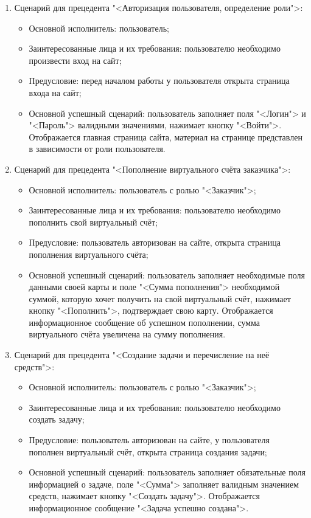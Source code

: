 \begin{enumerate}
\item Сценарий для прецедента "<Авторизация пользователя, определение роли">:
	\begin{itemize}
		\item Основной исполнитель: пользователь;
		\item Заинтересованные лица и их требования: пользователю необходимо произвести вход на сайт;
		\item Предусловие: перед началом работы у пользователя открыта страница входа на сайт;
		\item Основной успешный сценарий: пользователь заполняет поля "<Логин"> и "<Пароль"> валидными значениями, нажимает кнопку "<Войти">. Отображается главная страница сайта, материал на странице представлен в зависимости от роли пользователя.
	\end{itemize}
\item Сценарий для прецедента "<Пополнение виртуального счёта заказчика">:
	\begin{itemize}
		\item Основной исполнитель: пользователь с ролью "<Заказчик">;
		\item Заинтересованные лица и их требования: пользователю необходимо пополнить свой виртуальный счёт;
		\item Предусловие: пользователь авторизован на сайте, открыта страница пополнения виртуального счёта;
		\item Основной успешный сценарий: пользователь заполняет необходимые поля данными своей карты и поле "<Сумма пополнения"> необходимой суммой, которую хочет получить на свой виртуальный счёт, нажимает кнопку "<Пополнить">, подтверждает свою карту. Отображается информационное сообщение об успешном пополнении, сумма виртуального счёта увеличена на сумму пополнения.
	\end{itemize}
\item Сценарий для прецедента "<Создание задачи и перечисление на неё средств">:
	\begin{itemize}
		\item Основной исполнитель: пользователь с ролью "<Заказчик">;
		\item Заинтересованные лица и их требования: пользователю необходимо создать задачу;
		\item Предусловие: пользователь авторизован на сайте, у пользователя пополнен виртуальный счёт, открыта страница создания задачи;
		\item Основной успешный сценарий: пользователь заполняет обязательные поля информацией о задаче, поле "<Сумма"> заполняет валидным значением средств, нажимает кнопку "<Создать задачу">. Отображается информационное сообщение "<Задача успешно создана">.

\end{itemize}
\end{enumerate}
